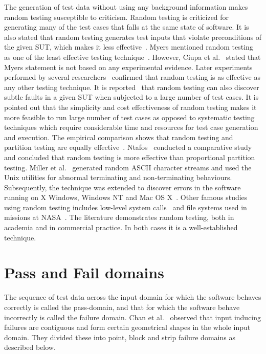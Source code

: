 The generation of test data without using any background information makes random testing susceptible to criticism. Random testing is criticized for generating many of the test cases that falls at the same state of software. It is also stated that random testing generates test inputs that violate preconditions of the given SUT, which makes it less effective~\cite{pacheco2009directed, sen2007effective}. Myers mentioned random testing as one of the least effective testing technique~\cite{myers2011art}. However, Ciupa et al.~\cite{ciupa2007experimental} stated that Myers statement is not based on any experimental evidence. Later experiments performed by several researchers~\cite{ciupa2008finding, hamlet1994random,  leitner2007efficient} confirmed that random testing is as effective as any other testing technique. It is reported~\cite{duran1981report} that random testing can also discover subtle faults in a given SUT when subjected to a large number of test cases. It is pointed out that the simplicity and cost effectiveness of random testing makes it more feasible to run large number of test cases as opposed to systematic testing techniques which require considerable time and resources for test case generation and execution. The empirical comparison shows that random testing and partition testing are equally effective~\cite{hamlet1990partition}. Ntafos~\cite{ntafos1998random} conducted a comparative study and concluded that random testing is more effective than proportional partition testing. Miller et al.~\cite{miller1990empirical} generated random ASCII character streams and used the Unix utilities for abnormal terminating and non-terminating behaviours. Subsequently, the technique was extended to discover errors in the software running on X Windows, Windows NT and Mac OS X~\cite{forrester2000empirical, miller2006empirical}. Other famous studies using random testing includes low-level system calls~\cite{kropp1998automated} and file systems used in missions at NASA~\cite{groce2007randomized}. The literature demonstrates random testing, both in academia and in commercial practice. In both cases it is a well-established technique. 




\section{Pass and Fail domains} \label{sec:failuredomains_2}
\label{sec:genuineandfailuredomain}
The sequence of test data across the input domain for which the software behaves correctly is called the pass-domain, and that for which the software behave incorrectly is called the failure domain. Chan et al.~\cite{chan1996proportional} observed that input inducing failures are contiguous and form certain geometrical shapes in the whole input domain. They divided these into point, block and strip failure domains as described below.

